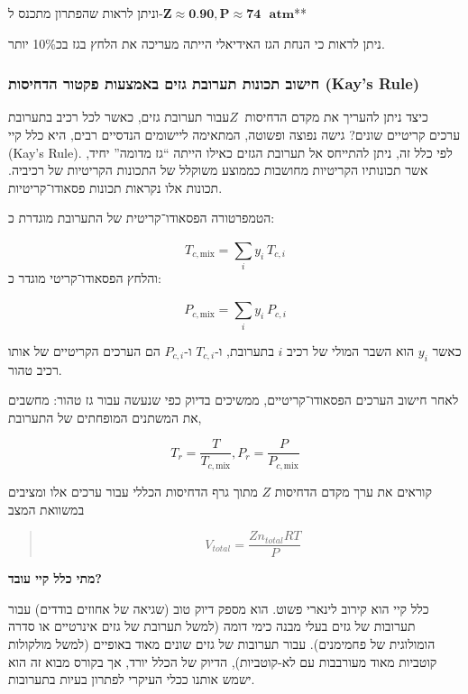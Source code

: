 \documentclass[
  hebrew,
  letterpaper,
  DIV=11,
  numbers=noendperiod]{scrreprt}
\begin{document}
וניתן לראות שהפתרון מתכנס
ל-\(\mathbf{Z} \approx \mathbf{0}.\mathbf{90},\mathbf{P} \approx \mathbf{74}\text{ }\mathbf{atm}\)**

ניתן לראות כי הנחת הגז האידיאלי הייתה מעריכה את הלחץ בגז בכ10\% יותר.

\subsubsection{חישוב תכונות תערובת גזים באמצעות פקטור הדחיסות (Kay's
Rule)}\label{ux5d7ux5d9ux5e9ux5d5ux5d1-ux5eaux5dbux5d5ux5e0ux5d5ux5ea-ux5eaux5e2ux5e8ux5d5ux5d1ux5ea-ux5d2ux5d6ux5d9ux5dd-ux5d1ux5d0ux5deux5e6ux5e2ux5d5ux5ea-ux5e4ux5e7ux5d8ux5d5ux5e8-ux5d4ux5d3ux5d7ux5d9ux5e1ux5d5ux5ea-kays-rule}

כיצד ניתן להעריך את מקדם הדחיסות \(Z\ \)עבור תערובת גזים, כאשר לכל רכיב
בתערובת ערכים קריטיים שונים? גישה נפוצה ופשוטה, המתאימה ליישומים הנדסיים
רבים, היא כלל קיי (Kay's Rule). לפי כלל זה, ניתן להתייחס אל תערובת הגזים
כאילו הייתה ``גז מדומה'' יחיד, אשר תכונותיו הקריטיות מחושבות כממוצע
משוקלל של התכונות הקריטיות של רכיביה. תכונות אלו נקראות תכונות
פסאודו־קריטיות.

הטמפרטורה הפסאודו־קריטית של התערובת מוגדרת כ:

\[T_{c,\text{mix}} = \sum_{i}^{}y_{i}\text{ }T_{c,i}\] והלחץ
הפסאודו־קריטי מוגדר כ:

\[P_{c,\text{mix}} = \sum_{i}^{}y_{i}\text{ }P_{c,i}\]

כאשר \(y_{i}\) הוא השבר המולי של רכיב \(i\) בתערובת, ו-\(T_{c,i}\)
ו-\(P_{c,i}\) הם הערכים הקריטיים של אותו רכיב טהור.

לאחר חישוב הערכים הפסאודו־קריטיים, ממשיכים בדיוק כפי שנעשה עבור גז טהור:
מחשבים את המשתנים המופחתים של התערובת,

\[T_{r} = \frac{T}{T_{c,\text{mix}}},P_{r} = \frac{P}{P_{c,\text{mix}}}\]

קוראים את ערך מקדם הדחיסות \(Z\) מתוך גרף הדחיסות הכללי עבור ערכים אלו
ומציבים במשוואת המצב

\begin{quote}
\[V_{total} = \frac{Zn_{total}RT}{P}\]
\end{quote}

\begin{tcolorbox}[enhanced jigsaw, colback=white, arc=.35mm, coltitle=black, breakable, toptitle=1mm, leftrule=.75mm, colbacktitle=quarto-callout-tip-color!10!white, opacitybacktitle=0.6, bottomtitle=1mm, titlerule=0mm, opacityback=0, colframe=quarto-callout-tip-color-frame, title=\textcolor{quarto-callout-tip-color}{\faLightbulb}\hspace{0.5em}{עצה}, rightrule=.15mm, bottomrule=.15mm, toprule=.15mm, left=2mm]

\textbf{מתי כלל קיי עובד?}

כלל קיי הוא קירוב לינארי פשוט. הוא מספק דיוק טוב (שגיאה של אחוזים
בודדים) עבור תערובות של גזים בעלי מבנה כימי דומה (למשל תערובת של גזים
אינרטיים או סדרה הומולוגית של פחמימנים). עבור תערובות של גזים שונים מאוד
באופיים (למשל מולקולות קוטביות מאוד מעורבבות עם לא-קוטביות), הדיוק של
הכלל יורד, אך בקורס מבוא זה הוא ישמש אותנו ככלי העיקרי לפתרון בעיות
בתערובות.

\end{tcolorbox}
\end{document}
